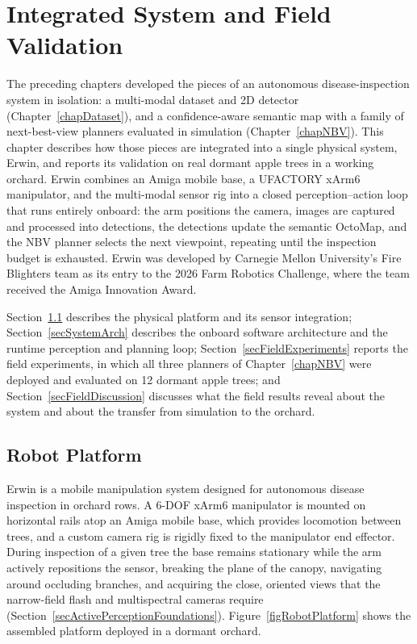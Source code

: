
\chapter{Integrated System and Field Validation} \label{chapErwin}

The preceding chapters developed the pieces of an autonomous
disease-inspection system in isolation: a multi-modal dataset and 2D
detector (Chapter~\ref{chapDataset}), and a confidence-aware semantic map
with a family of next-best-view planners evaluated in simulation
(Chapter~\ref{chapNBV}). This chapter describes how those pieces are
integrated into a single physical system, Erwin, and reports its
validation on real dormant apple trees in a working orchard. Erwin combines
an Amiga mobile base, a UFACTORY xArm6 manipulator, and the multi-modal
sensor rig into a closed perception--action loop that runs entirely onboard:
the arm positions the camera, images are captured and processed into
detections, the detections update the semantic OctoMap, and the NBV planner
selects the next viewpoint, repeating until the inspection budget is
exhausted. Erwin was developed by Carnegie Mellon University's Fire Blighters
team as its entry to the 2026 Farm Robotics Challenge, where the team
received the Amiga Innovation Award.

Section~\ref{secRobotPlatform} describes the physical platform and its
sensor integration; Section~\ref{secSystemArch} describes the onboard
software architecture and the runtime perception and planning loop;
Section~\ref{secFieldExperiments} reports the field experiments, in which
all three planners of Chapter~\ref{chapNBV} were deployed and evaluated on
12 dormant apple trees; and Section~\ref{secFieldDiscussion} discusses what
the field results reveal about the system and about the transfer from
simulation to the orchard.

\section{Robot Platform} \label{secRobotPlatform}

Erwin is a mobile manipulation system designed for autonomous disease
inspection in orchard rows. A 6-DOF xArm6 manipulator is mounted on
horizontal rails atop an Amiga mobile base, which provides locomotion
between trees, and a custom camera rig is rigidly fixed to the manipulator
end effector. During inspection of a given tree the base remains stationary
while the arm actively repositions the sensor, breaking the plane of the
canopy, navigating around occluding branches, and acquiring the close,
oriented views that the narrow-field flash and multispectral cameras
require (Section~\ref{secActivePerceptionFoundations}). Figure~\ref{figRobotPlatform}
shows the assembled platform deployed in a dormant orchard.

